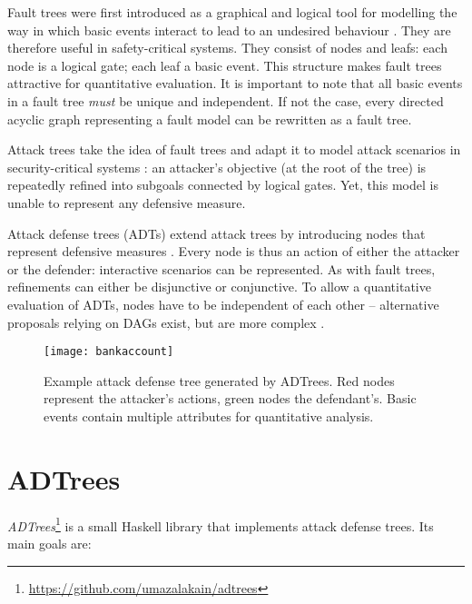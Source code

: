 \documentclass{scrreprt}
\begin{document}
Fault trees were first introduced as a graphical and logical tool for modelling
the way in which basic events interact to lead to an undesired behaviour
\cite[IV.1]{Vesely1981}. They are therefore useful in safety-critical systems.
They consist of nodes and leafs: each node is a logical gate; each leaf a basic
event. This structure makes fault trees attractive for quantitative evaluation.
It is important to note that all basic events in a fault tree \textit{must} be
unique and independent. If not the case, every directed acyclic graph
representing a fault model can be rewritten as a fault tree.  

Attack trees take the idea of fault trees and adapt it to model attack scenarios
in security-critical systems \cite{Schneier1999} \cite{Brooke2003}
\cite{NaiFovino2009}: an attacker's objective (at the root of the tree) is
repeatedly refined into subgoals connected by logical gates. Yet, this model is
unable to represent any defensive measure.

Attack defense trees (ADTs) extend attack trees by introducing nodes that
represent defensive measures \cite{KordyFoundations}. Every node is thus an
action of either the attacker or the defender: interactive scenarios can be
represented.  As with fault trees, refinements can either be disjunctive or
conjunctive. To allow a quantitative evaluation of ADTs, nodes have to be
independent of each other -- alternative proposals relying on DAGs exist, but
are more complex \cite{KordyDAG}.


\begin{figure}[h]
    \label{example-adt}
    \centering
    \texttt{[image: bankaccount]}
    \caption{Example attack defense tree generated by ADTrees. Red nodes
    represent the attacker's actions, green nodes the defendant's. Basic events
    contain multiple attributes for quantitative analysis.}
\end{figure}


\section{ADTrees}

\textit{ADTrees}\footnote{\url{https://github.com/umazalakain/adtrees}}
is a small Haskell library that implements attack defense trees. Its main goals
are:
\end{document}
